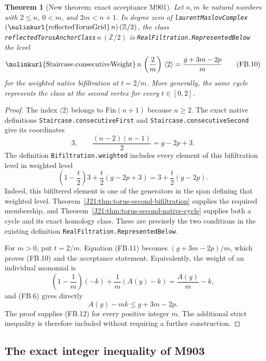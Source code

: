 \documentclass[11pt,oneside]{report}
\newtheorem{theorem}{Theorem}[section]
\theoremstyle{definition}
\numberwithin{equation}{section}
\newcommand{\decl}[1]{\textnormal{\nolinkurl{#1}}}
\begin{document}
\begin{theorem}[New theorem: exact acceptance M901]
\label{J21:thm:torus-second-M901}
Let $n,m$ be natural numbers with $2\leq n$, $0<m$, and
$2m<n+1$.
In degree zero of
\decl{laurentMaslovComplex}\,$(\decl{reflectedTorusGrid}\,n)\,
(\mathbb Z/2)$, the class
\decl{reflectedTorusAnchorClass}\,$n\,(\mathbb Z/2)$ is
\decl{RealFiltration.RepresentedBelow} the level
\[
       \decl{Staircase.consecutiveWeight}\,
                   n\,\left(\frac2m\right)\,\langle2\rangle
                       =\frac{g+3m-2p}{m}
 \tag{FB.10}
\]
for the weighted native bifiltration at $t=2/m$.
More generally, the same cycle represents the class at the second
vertex for every $t\in[0,2]$.
\end{theorem}
\begin{proof}
The index $\langle2\rangle$ belongs to $\mathrm{Fin}(n+1)$ because
$n\geq2$.
The exact native definitions
\decl{Staircase.consecutiveFirst} and
\decl{Staircase.consecutiveSecond} give its coordinates
\[
                     3,\qquad \frac{(n-2)(n-1)}2=g-2p+3.
\]
The definition \decl{Bifiltration.weighted} includes every element
of this bifiltration level in weighted level
\[
                \left(1-\frac t2\right)3
                    +\frac t2(g-2p+3)
                =3+\frac t2(g-2p).
 \tag{FB.11}
\]
Indeed, this bifiltered element is one of the generators in the
span defining that weighted level.
Theorem~\ref{J21:thm:torus-second-bifiltration} supplies the required
membership, and Theorem~\ref{J21:thm:torus-second-native-cycle} supplies
both a cycle and its exact homology class.
These are precisely the two conditions in the existing definition
\decl{RealFiltration.RepresentedBelow}.

For $m>0$, put $t=2/m$.
Equation (FB.11) becomes $(g+3m-2p)/m$, which proves (FB.10) and
the acceptance statement.
Equivalently, the weight of an individual monomial is
\[
       \left(1-\frac1m\right)(-k)+\frac1m(A(y)-k)
                         =\frac{A(y)}m-k,
\]
and (FB.6) gives directly
\[
                        A(y)-mk\leq g+3m-2p.
 \tag{FB.12}
\]
The proof supplies (FB.12) for every positive integer $m$.
The additional strict inequality is therefore included without
requiring a further construction.
\end{proof}

\subsection{The exact integer inequality of M903}
\end{document}
